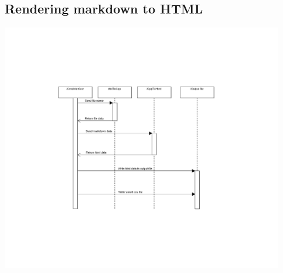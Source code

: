 \subsection{Rendering markdown to HTML}
\noindent\includegraphics[width=350pt]{images/mdToHtml.png}
